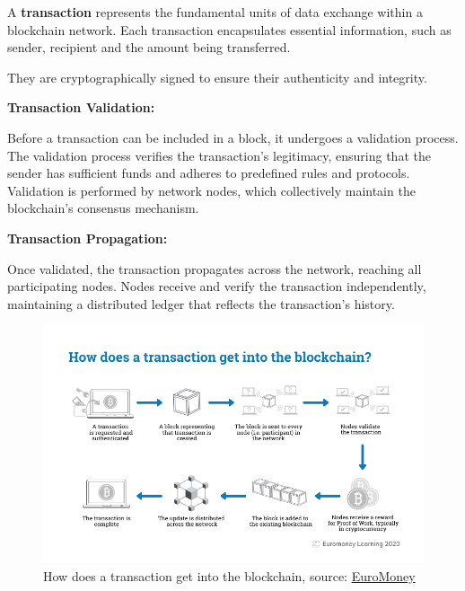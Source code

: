 A \textbf{transaction} represents the fundamental units of data exchange within a blockchain network. Each transaction encapsulates essential information, such as sender, recipient and the amount being transferred.

They are cryptographically signed to ensure their authenticity and integrity.\newline

\textbf{Transaction Validation:}\newline

Before a transaction can be included in a block, it undergoes a validation process.
The validation process verifies the transaction's legitimacy, ensuring that the sender has sufficient funds and adheres to predefined rules and protocols.
Validation is performed by network nodes, which collectively maintain the blockchain's consensus mechanism.\newline

\textbf{Transaction Propagation:}\newline

Once validated, the transaction propagates across the network, reaching all participating nodes.
Nodes receive and verify the transaction independently, maintaining a distributed ledger that reflects the transaction's history.\newline


\begin{figure}[htbp]
	\centering
	\includegraphics[scale=0.5]{figures/transact.png}  %
	\caption{How does a transaction get into the blockchain, source: \href{https://www.euromoney.com/learning/blockchain-explained/how-transactions-get-into-the-blockchain}{EuroMoney}}
	\label{fig:trans}
\end{figure}


